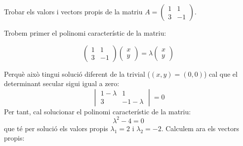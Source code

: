\Exercise[title=Vectors i valors propis en una matriu $2\times 2$\medskip] 
\vspace{\baselineskip}
Trobar els valors i vectors propis de la matriu $A=\begin{pmatrix}1&1\\3&-1\end{pmatrix}$.
\Answer

Trobem primer el polinomi característic de la matriu:

\[
  \begin{pmatrix}1&1\\3&-1\end{pmatrix}
  \begin{pmatrix}x\\y\end{pmatrix}=\lambda\begin{pmatrix}x\\y\end{pmatrix}\]

  Perquè això tingui solució diferent de la trivial ($(x,y)=(0,0)$) cal que el determinant secular sigui igual a zero:
  \[
  \begin{vmatrix}1-\lambda&1\\3&-1-\lambda\end{vmatrix}=0  
  \]
  Per tant, cal solucionar el polinomi característic de la matriu:
  \[\lambda^2-4=0\]
que té per solució els valors propis $\lambda_1=2$ i $\lambda_2=-2$. Calculem ara els vectors propis:

